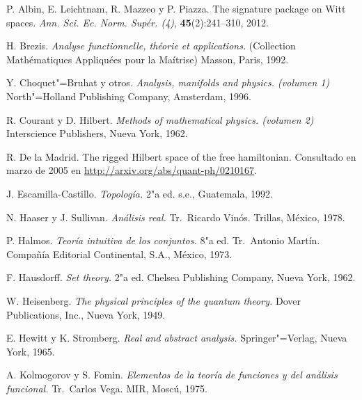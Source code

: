 
\begin{thebibliography}{99}

 P. Albin, E. Leichtnam, R. Mazzeo y P. Piazza. The signature package on Witt spaces. \textit{Ann. Sci. Ec. Norm. Supér. (4)}, \textbf{45}(2):241--310, 2012.

 H. Brezis. \textit{Analyse functionnelle, théorie et applications.} (Collection Mathématiques Appliquées pour la Maítrise) Masson, Paris, 1992.

 Y. Choquet"=Bruhat y otros. \textit{Analysis, manifolds and physics. (volumen 1)} North"=Holland Publishing Company, Amsterdam, 1996.

 R. Courant y {D. Hilbert}. \textit{Methods of mathematical physics. (volumen 2)} Interscience Publishers, Nueva York, 1962.

 R. {De la Madrid}. The rigged {Hilbert} space of the free hamiltonian. Consultado en marzo de 2005 en \url{http://arxiv.org/abs/quant-ph/0210167}.

 J. Escamilla-Castillo. \textit{Topología.} 2"a ed. s.e., Guatemala, 1992.

 N. Haaser y {J. Sullivan}. \textit{Análisis real.}  Tr.~Ricardo Vinós. Trillas, México, 1978.

 P. Halmos. \textit{Teoría intuitiva de los conjuntos.} 8"a ed. Tr.~Antonio Martín. Compañía Editorial Continental, S.A., México, 1973.

 F. Hausdorff. \textit{Set theory.} 2"a ed. Chelsea Publishing Company, Nueva York, 1962.

 W. Heisenberg. \textit{The physical principles of the quantum theory.} Dover Publications, Inc., Nueva York, 1949.

 E. Hewitt y {K. Stromberg}. \textit{Real and abstract analysis.} Springer"=Verlag, Nueva York, 1965.

 A. Kolmogorov y {S. Fomin}. \textit{Elementos de la teoría de funciones y del análisis funcional.} Tr.~Carlos Vega. MIR, Moscú, 1975.


\end{thebibliography}

